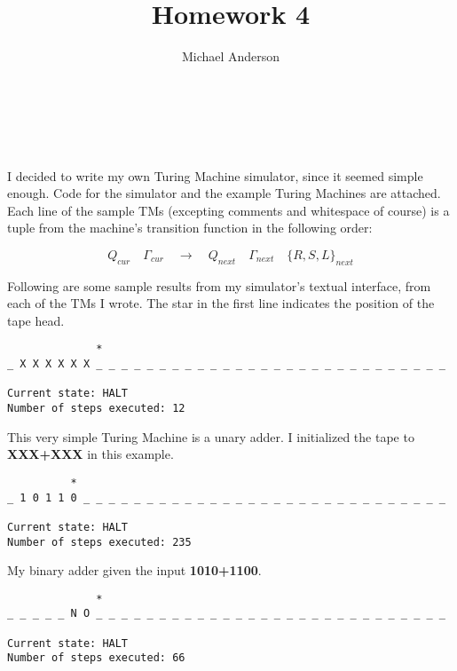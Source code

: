 \documentclass{article}
\author{Michael Anderson}
\title{Homework 4}
\begin{document}
\maketitle
{}
\\
\flushleft
\newpage

\section{}
I decided to write my own Turing Machine simulator, since it seemed simple
enough. Code for the simulator and the example Turing Machines are attached.
Each line of the
sample TMs (excepting comments and whitespace of course) is a
tuple from the machine's transition function in the following order:

\[
Q_{cur} \quad \Gamma_{cur} \quad \rightarrow \quad Q_{next} \quad \Gamma_{next}
\quad \{R,S,L\}_{next}
\]

Following are some sample results from my simulator's textual interface, from
each of the TMs I wrote. The star in the first line
indicates the position of the tape head.

\vspace{2em}

\begin{verbatim}
              *
_ X X X X X X _ _ _ _ _ _ _ _ _ _ _ _ _ _ _ _ _ _ _ _ _ _ _ _ _ _ _ _

Current state: HALT
Number of steps executed: 12
\end{verbatim}

This very simple Turing Machine is a unary adder. I initialized the tape
to \textbf{XXX+XXX} in this example.

\vspace{3em}

\begin{verbatim}
          *
_ 1 0 1 1 0 _ _ _ _ _ _ _ _ _ _ _ _ _ _ _ _ _ _ _ _ _ _ _ _ _ _ _ _ _

Current state: HALT
Number of steps executed: 235
\end{verbatim}

My binary adder given the input \textbf{1010+1100}.

\vspace{3em}

\begin{verbatim}
              *
_ _ _ _ _ N O _ _ _ _ _ _ _ _ _ _ _ _ _ _ _ _ _ _ _ _ _ _ _ _ _ _ _ _

Current state: HALT
Number of steps executed: 66
\end{verbatim}
\end{document}
